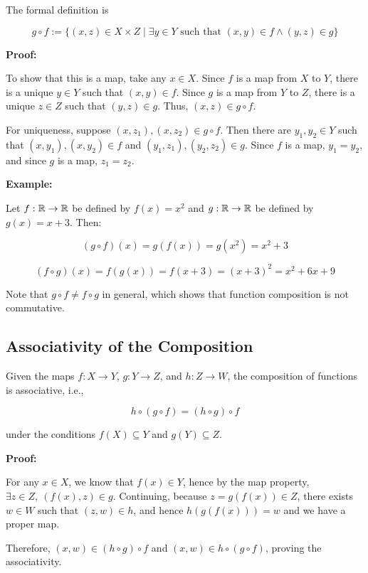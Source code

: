 The formal definition is

\[
	g \circ f := \{ (x, z) \in X \times Z \mid \exists y \in Y \text{ such that } (x, y) \in f \land (y, z) \in g \}
\]

\textbf{Proof:}

To show that this is a map, take any \(x \in X\). Since \(f\) is a map from \(X\) to \(Y\), there is a unique \(y \in Y\) such that \((x,y) \in f\). Since \(g\) is a map from \(Y\) to \(Z\), there is a unique \(z \in Z\) such that \((y,z) \in g\). Thus, \((x,z) \in g \circ f\).

For uniqueness, suppose \((x,z_1), (x,z_2) \in g \circ f\). Then there are \(y_1,y_2 \in Y\) such that \((x,y_1), (x,y_2) \in f\) and \((y_1,z_1), (y_2,z_2) \in g\). Since \(f\) is a map, \(y_1 = y_2\), and since \(g\) is a map, \(z_1 = z_2\).

\QED

\textbf{Example:}

Let \(f: \mathbb{R} \to \mathbb{R}\) be defined by \(f(x) = x^2\) and \(g: \mathbb{R} \rightarrow \mathbb{R}\) be defined
by \(g(x) = x+3\). Then:

\[
	(g \circ f)(x) = g(f(x)) = g(x^2) = x^2 + 3
\]

\[
	(f \circ g)(x) = f(g(x)) = f(x+3) = {(x+3)}^2 = x^2 + 6x + 9
\]

Note that \(g \circ f \neq f \circ g\) in general, which shows that function composition is not
commutative.

\subsection{Associativity of the Composition}

Given the maps \(f: X \to Y\), \(g: Y \to Z\), and \(h: Z \to W\), the composition of functions is associative, i.e.,

\[
	h \circ (g \circ f) = (h \circ g) \circ f
\]

under the conditions \(f(X) \subseteq Y\) and \(g(Y) \subseteq Z\).

\textbf{Proof:}

For any \(x \in X\), we know that \(f(x) \in Y\), hence by the map property, \(\exists z \in Z, \ (f(x), z) \in g\). Continuing,
because \(z = g(f(x)) \in Z\), there exists \(w \in W\) such that \((z, w) \in h\), and hence \(h(g(f(x))) = w\) and we have a proper map.

Therefore, \((x, w) \in (h \circ g) \circ f\) and \((x, w) \in h \circ (g \circ f)\), proving the associativity.

